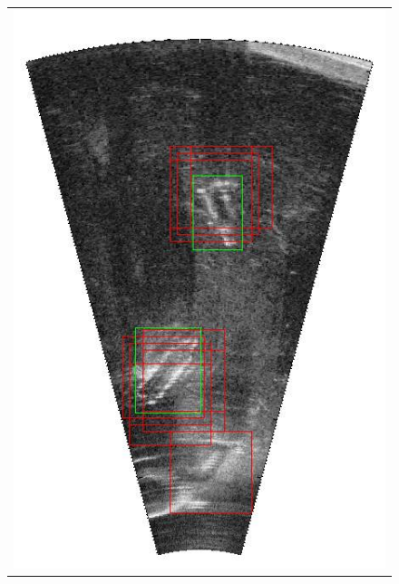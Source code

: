 \begin{figure}[p]
{\begin{tabular}[b]{c}
		\includegraphics[height=0.22\textheight]{chapters/images/proposals/detections/fcn-nms070-2016-02-11_035335-frame11602-topK10-proposals.jpg}\\

\end{tabular}}
\end{figure}
